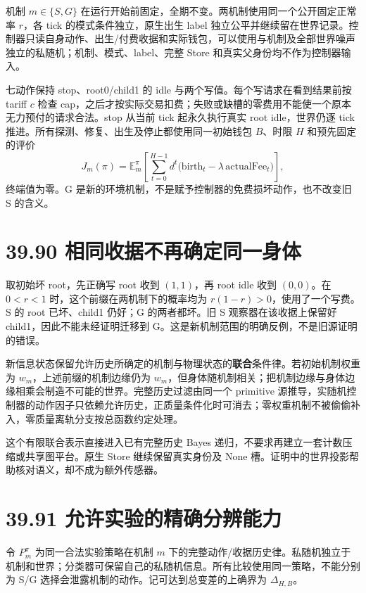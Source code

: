 \documentclass[
  11pt,
  oneside]{book}
\begin{document}
机制 \(m\in\{S,G\}\) 在运行开始前固定，全期不变。两机制使用同一个公开固定正常率 \(r\)，各 tick 的模式条件独立，原生出生 label 独立公平并继续留在世界记录。控制器只读自身动作、出生/付费收据和实际钱包，可以使用与机制及全部世界噪声独立的私随机；机制、模式、label、完整 Store 和真实父身份均不作为控制器输入。

七动作保持 stop、root0/child1 的 idle 与两个写值。每个写请求在看到结果前按 tariff \(c\) 检查 cap，之后才按实际交易扣费；失败或缺槽的零费用不能使一个原本无力预付的请求合法。stop 从当前 tick 起永久执行真实 root idle，世界仍逐 tick 推进。所有探测、修复、出生及停止都使用同一初始钱包 \(B\)、时限 \(H\) 和预先固定的评价 \[J_m(\pi)=\mathbb E_m^\pi\!\left[\sum_{t=0}^{H-1}d^t\bigl(\mathrm{birth}_t-\lambda\,\mathrm{actualFee}_t\bigr)\right],\] 终端值为零。G 是新的环境机制，不是赋予控制器的免费损坏动作，也不改变旧 S 的含义。

\section{39.90 相同收据不再确定同一身体}\label{ux76f8ux540cux6536ux636eux4e0dux518dux786eux5b9aux540cux4e00ux8eabux4f53}

取初始坏 root，先正确写 root 收到 \((1,1)\)，再 root idle 收到 \((0,0)\)。在 \(0<r<1\) 时，这个前缀在两机制下的概率均为 \(r(1-r)>0\)，使用了一个写费。S 的 root 已坏、child1 仍好；G 的两者都坏。旧 S 观察器在该收据上保留好 child1，因此不能未经证明迁移到 G。这是新机制范围的明确反例，不是旧源证明的错误。

新信息状态保留允许历史所确定的机制与物理状态的\textbf{联合}条件律。若初始机制权重为 \(w_m\)，上述前缀的机制边缘仍为 \(w_m\)，但身体随机制相关；把机制边缘与身体边缘相乘会制造不可能的世界。完整历史过滤由同一个 primitive 源推导，实随机控制器的动作因子只依赖允许历史，正质量条件化时可消去；零权重机制不被偷偷补入，零质量离轨分支按总函数约定处理。

这个有限联合表示直接进入已有完整历史 Bayes 递归，不要求再建立一套计数压缩或共享图平台。原生 Store 继续保留真实身份及 None 槽。证明中的世界投影帮助核对语义，却不成为额外传感器。

\section{39.91 允许实验的精确分辨能力}\label{ux5141ux8bb8ux5b9eux9a8cux7684ux7cbeux786eux5206ux8fa8ux80fdux529b}

令 \(P_m^\pi\) 为同一合法实验策略在机制 \(m\) 下的完整动作/收据历史律。私随机独立于机制和世界；分类器可保留自己的私随机信息。所有比较使用同一策略，不能分别为 S/G 选择会泄露机制的动作。记可达到总变差的上确界为 \(\Delta_{H,B}\)。
\end{document}
